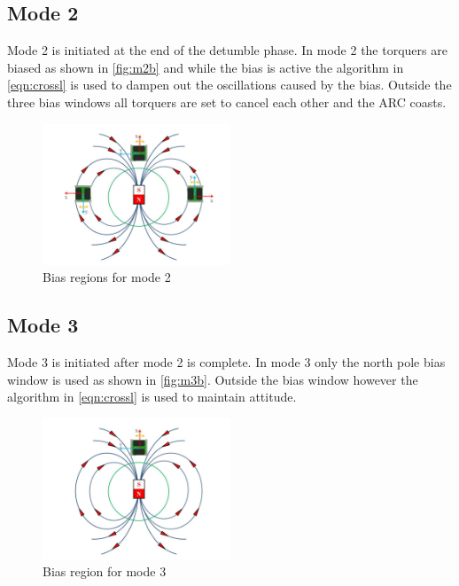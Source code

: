 \subsection{Mode 2}

Mode 2 is initiated at the end of the detumble phase. In mode 2 the torquers are biased as shown in \autoref{fig:m2b} and while the bias is active the algorithm in \autoref{eqn:crossl} is used to dampen out the oscillations caused by the bias. Outside the three bias windows all torquers are set to cancel each other and the \ac{ARC} coasts.

\begin{figure}[H]
    \centering
    \includegraphics[width=0.5\textwidth]{Figures/Mode-2-Bias}
    \caption{Bias regions for mode 2}
    \label{fig:m2b}
\end{figure}

\subsection{Mode 3}

Mode 3 is initiated after mode 2 is complete. In mode 3 only the north pole bias window is used as shown in \autoref{fig:m3b}. Outside the bias window however the algorithm in \autoref{eqn:crossl} is used to maintain attitude.

\begin{figure}[H]
    \centering
    \includegraphics[width=0.5\textwidth]{Figures/Mode-3-Bias}
    \caption{Bias region for mode 3}
    \label{fig:m3b}
\end{figure}

